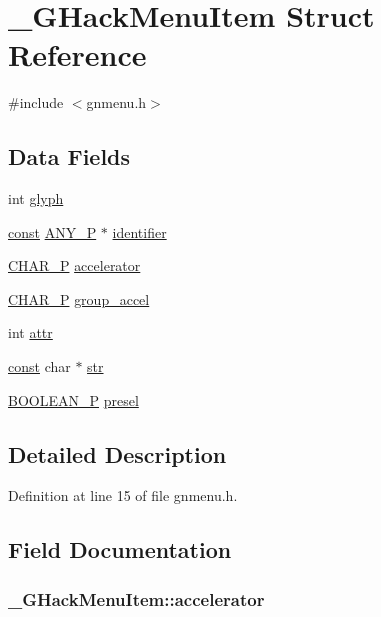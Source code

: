 \hypertarget{struct__GHackMenuItem}{\section{\+\_\+\+G\+Hack\+Menu\+Item Struct Reference}
\label{struct__GHackMenuItem}
}


{\ttfamily \#include $<$gnmenu.\+h$>$}

\subsection*{Data Fields}
\begin{DoxyCompactItemize}
\item 
int \hyperlink{struct__GHackMenuItem_acfcd2d3604cfa6ff4083472b493cbfb0}{glyph}
\item 
\hyperlink{tradstdc_8h_a2c212835823e3c54a8ab6d95c652660e}{const} \hyperlink{wintype_8h_ae29f750de92b8a7c2566957e5863fbed}{A\+N\+Y\+\_\+\+P} $\ast$ \hyperlink{struct__GHackMenuItem_a79a3cfa67a108ba6055d4fa6bd081f79}{identifier}
\item 
\hyperlink{wingem1_8c_ada878a8b4864a1658ee0f0acd5a89412}{C\+H\+A\+R\+\_\+\+P} \hyperlink{struct__GHackMenuItem_ab600d7cf5d77e6edfcdb55446defd2e7}{accelerator}
\item 
\hyperlink{wingem1_8c_ada878a8b4864a1658ee0f0acd5a89412}{C\+H\+A\+R\+\_\+\+P} \hyperlink{struct__GHackMenuItem_a3d933471459a6fa6e6ed39a630081b3c}{group\+\_\+accel}
\item 
int \hyperlink{struct__GHackMenuItem_a3200e3f2ba0798dc63e0f7abe98652bd}{attr}
\item 
\hyperlink{tradstdc_8h_a2c212835823e3c54a8ab6d95c652660e}{const} char $\ast$ \hyperlink{struct__GHackMenuItem_a338f49c097ab2101d16b3acb300ebf41}{str}
\item 
\hyperlink{wingem1_8c_aa2723cc3af18a5199ab4ce7cca84d82b}{B\+O\+O\+L\+E\+A\+N\+\_\+\+P} \hyperlink{struct__GHackMenuItem_a0b6f9304a066862ccf1cf77632e4936c}{presel}
\end{DoxyCompactItemize}


\subsection{Detailed Description}


Definition at line 15 of file gnmenu.\+h.



\subsection{Field Documentation}
\hypertarget{struct__GHackMenuItem_ab600d7cf5d77e6edfcdb55446defd2e7}{
\subsubsection[{accelerator}]{ \+\_\+\+G\+Hack\+Menu\+Item\+::accelerator}}\label{struct__GHackMenuItem_ab600d7cf5d77e6edfcdb55446defd2e7}


